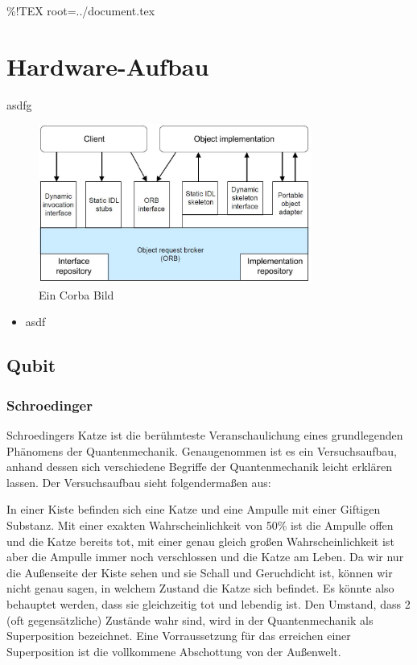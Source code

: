 \%!TEX root=../document.tex

\section{Hardware-Aufbau}
\label{sec:Hardware-Aufbau}

asdfg \cite{brands11}

\begin{figure}[!htb]
	\centering\includegraphics[width=0.8\textwidth]{images/corba.jpg}
	\caption{Ein Corba Bild}
	\label{corba}
\end{figure}

\begin{itemize}
    \item asdf
\end{itemize}


\subsection{Qubit}
\label{sec:Qubit}

\subsubsection{Schroedinger}

Schroedingers Katze ist die berühmteste Veranschaulichung eines grundlegenden Phänomens der Quantenmechanik. Genaugenommen ist es ein Versuchsaufbau, anhand dessen sich verschiedene Begriffe der Quantenmechanik leicht erklären lassen. Der Versuchsaufbau sieht folgendermaßen aus:

In einer Kiste befinden sich eine Katze und eine Ampulle mit einer Giftigen Substanz. Mit einer exakten Wahrscheinlichkeit von 50\% ist die Ampulle offen und die Katze bereits tot, mit einer genau gleich großen Wahrscheinlichkeit ist aber die Ampulle immer noch verschlossen und die Katze am Leben. Da wir nur die Außenseite der Kiste sehen und sie Schall und Geruchdicht ist, können wir nicht genau sagen, in welchem Zustand die Katze sich befindet. Es könnte also behauptet werden, dass sie gleichzeitig tot und lebendig ist.
Den Umstand, dass 2 (oft gegensätzliche) Zustände wahr sind, wird in der Quantenmechanik als Superposition bezeichnet. Eine Vorraussetzung für das erreichen einer Superposition ist die vollkommene Abschottung von der Außenwelt. 

